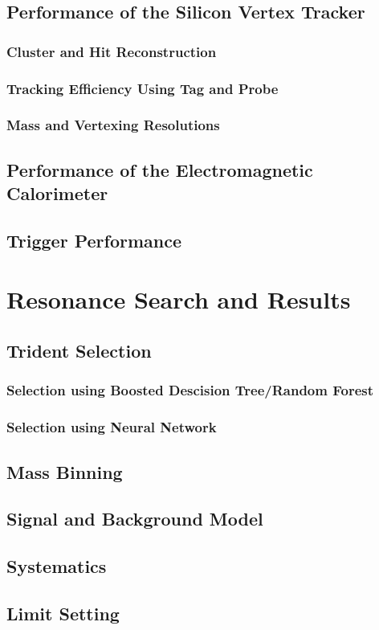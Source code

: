 \documentclass[12pt]{report}
\begin{document}
\section{Performance of the Silicon Vertex Tracker}
\subsection{Cluster and Hit Reconstruction}
\subsection{Tracking Efficiency Using Tag and Probe}
\subsection{Mass and Vertexing Resolutions}

\section{Performance of the Electromagnetic Calorimeter}

\section{Trigger Performance}

\chapter{Resonance Search and Results}
\section{Trident Selection}
\subsection{Selection using Boosted Descision Tree/Random Forest}
\subsection{Selection using Neural Network}
\section{Mass Binning}
\section{Signal and Background Model}
\section{Systematics}
\section{Limit Setting}
\end{document}
